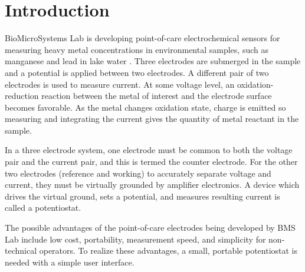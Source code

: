 \documentclass[
10pt, %
letterpaper, %
oneside, %
headinclude,footinclude, %
BCOR5mm, %
]{scrartcl}
\begin{document}




\newpage %


\section{Introduction}

BioMicroSystems Lab is developing point-of-care electrochemical sensors for measuring heavy metal concentrations in environmental samples,
such as manganese and lead in lake water \cite{bms-article}.
Three electrodes are submerged in the sample and a potential is applied between two electrodes.
A different pair of two electrodes is used to measure current.
At some voltage level, an oxidation-reduction reaction between the metal of interest and the electrode surface becomes favorable.
As the metal changes oxidation state, charge is emitted so measuring and integrating the current gives the quantity of metal reactant in the sample.

In a three electrode system, one electrode must be common to both the voltage pair and the current pair,
and this is termed the counter electrode.
For the other two electrodes (reference and working) to accurately separate voltage and current,
they must be virtually grounded by amplifier electronics.
A device which drives the virtual ground, sets a potential, and measures resulting current is called a potentiostat.

The possible advantages of the point-of-care electrodes being developed by BMS Lab include
low cost, portability, measurement speed, and simplicity for non-technical operators.
To realize these advantages, a small, portable potentiostat is needed with a simple user interface.
 
\end{document}
